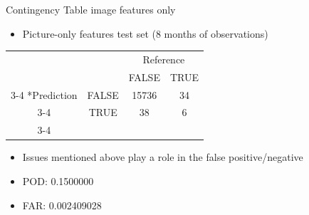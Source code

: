 \documentclass[10pt,fleqn]{beamer}\usepackage[]{graphicx}\usepackage[]{color}
\begin{document}
\begin{frame}{Contingency Table image features only}\centering
% 
\begin{itemize}
\item {Picture-only features test set (8 months of observations)}

% 
\end{itemize}
\begin{table}
    \begin{tabular}{cc|c|c|}
       & \multicolumn{1}{c}{} & \multicolumn{2}{c}{Reference}\\
       & \multicolumn{1}{c}{} & \multicolumn{1}{c}{FALSE}  & \multicolumn{1}{c}{TRUE} \\\cline{3-4}
       \multirow{2}*{Prediction}  & FALSE & 15736  & 34 \\\cline{3-4}
      & TRUE & 38 &6 \\\cline{3-4}
    \end{tabular}
  \end{table}
  
  \begin{itemize}
\item {Issues mentioned above play a role in the false positive/negative}
\item{POD: 0.1500000}
\item{FAR: 0.002409028}

% 
\end{itemize}
  
% 
% 
 \end{frame}
\end{document}
